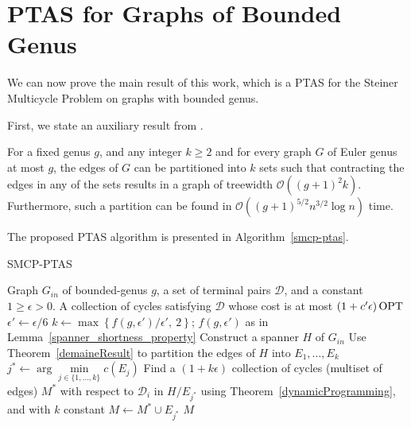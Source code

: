 \section{PTAS for Graphs of Bounded Genus}
\label{section:ptas_bounded_genus}

We can now prove the main result of this work, which is a PTAS for the Steiner Multicycle Problem on graphs with bounded genus.

First, we state an auxiliary result from \cite{Demaine2010}.

\begin{ftheo} \label{demaineResult}
    For a fixed genus \(g\), and any integer \(k \geq 2\) and for every graph \(G\) of Euler genus at most \(g\), the edges of \(G\) can be partitioned into \(k\) sets such that contracting the edges in any of the sets results in a graph of treewidth \(\mathcal{O}((g + 1)^2k)\). Furthermore, such a partition can be found in \(\mathcal{O}((g+ 1)^{5/2} n^{3/2} \log{n})\) time.
\end{ftheo}

The proposed PTAS algorithm is presented in Algorithm~\ref{smcp-ptas}.

\begin{algorithm}
\caption{SMCP-PTAS}
\label{smcp-ptas}
\begin{algorithmic}[1]

\Require Graph \(G_{in}\) of bounded-genus \(g\), a set of terminal pairs \(\mathcal{D}\), and a constant \(1 \geq \epsilon > 0\).
\Ensure A collection of cycles satisfying \(\mathcal{D}\) whose cost is at most \((1 + c' \epsilon) \operatorname{\textrm{OPT}}\)
\State  \(\epsilon' \gets \epsilon / 6\)
\State  \(k \gets \max\left \{ f(g, \epsilon')/{\epsilon'}, \: 2\right \}\); \(f(g, \epsilon')\) as in Lemma~\ref{spanner_shortness_property} \label{alg_smcp_ptas:k}
\State Construct a spanner \(H\) of \(G_{in}\) \label{alg_smcp_ptas:SpannerCall}
\State Use Theorem~\ref{demaineResult} to partition the edges of \(H\) into \(E_1, \dots, E_k\) \label{alg_smcp_ptas:partDemaine}
\State  \(j^\ast \gets \arg\min\limits_{j \in \{1,\ldots,k\}} c(E_j)\)
\State Find a \((1 + k \epsilon)\) collection of cycles (multiset of edges) \(M^\ast\) with respect to \(\mathcal{D}_i\) in \(H/E_{j^\ast}\) using Theorem~\ref{dynamicProgramming}, and with \(k\) constant \label{alg_smcp_ptas:dp}
\State \(M \gets M^\ast \cup E_{j^\ast}\)
\State \Return  \(M\)

\end{algorithmic}
\end{algorithm}

